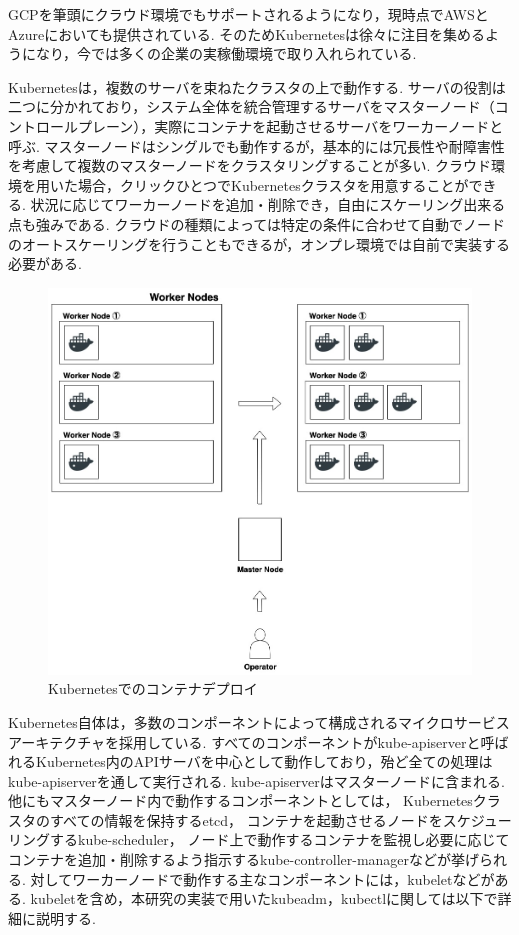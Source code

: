 GCPを筆頭にクラウド環境でもサポートされるようになり，現時点でAWSとAzureにおいても提供されている.
そのためKubernetesは徐々に注目を集めるようになり，今では多くの企業の実稼働環境で取り入れられている.

Kubernetesは，複数のサーバを束ねたクラスタの上で動作する.
サーバの役割は二つに分かれており，システム全体を統合管理するサーバをマスターノード（コントロールプレーン），実際にコンテナを起動させるサーバをワーカーノードと呼ぶ.
マスターノードはシングルでも動作するが，基本的には冗長性や耐障害性を考慮して複数のマスターノードをクラスタリングすることが多い.
クラウド環境を用いた場合，クリックひとつでKubernetesクラスタを用意することができる.
状況に応じてワーカーノードを追加・削除でき，自由にスケーリング出来る点も強みである.
クラウドの種類によっては特定の条件に合わせて自動でノードのオートスケーリングを行うこともできるが，オンプレ環境では自前で実装する必要がある.

\begin{figure}[htbp]
\begin{center}
    \includegraphics[width=\textwidth]{./figures/k8s-deploy-container.jpg}
    \caption{Kubernetesでのコンテナデプロイ}
\end{center}
\end{figure}

Kubernetes自体は，多数のコンポーネントによって構成されるマイクロサービスアーキテクチャを採用している.
すべてのコンポーネントがkube-apiserverと呼ばれるKubernetes内のAPIサーバを中心として動作しており，殆ど全ての処理はkube-apiserverを通して実行される.
kube-apiserverはマスターノードに含まれる.
他にもマスターノード内で動作するコンポーネントとしては，
Kubernetesクラスタのすべての情報を保持するetcd，
コンテナを起動させるノードをスケジューリングするkube-scheduler，
ノード上で動作するコンテナを監視し必要に応じてコンテナを追加・削除するよう指示するkube-controller-managerなどが挙げられる.
対してワーカーノードで動作する主なコンポーネントには，kubeletなどがある.
kubeletを含め，本研究の実装で用いたkubeadm，kubectlに関しては以下で詳細に説明する.

